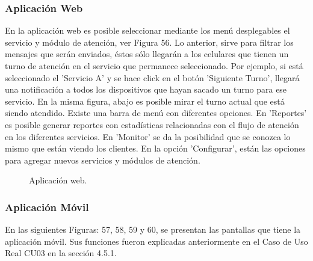 \subsubsection{Aplicación Web}

En la aplicación web es posible seleccionar mediante los menú desplegables el servicio y módulo de atención, ver Figura 56. Lo anterior, sirve para filtrar los mensajes que serán enviados, éstos sólo llegarán a los celulares que tienen un turno de atención en el servicio que permanece seleccionado. Por ejemplo, si está seleccionado el 'Servicio A' y se hace click en el botón 'Siguiente Turno', llegará una notificación a todos los dispositivos que hayan sacado un turno para ese servicio. En la misma figura, abajo es posible mirar el turno actual que está siendo atendido. Existe una barra de menú con diferentes opciones. En 'Reportes' es posible generar reportes con estadísticas relacionadas con el flujo de atención en los diferentes servicios. En 'Monitor' se da la posibilidad que se conozca lo mismo que están viendo los clientes. En la opción 'Configurar', están las opciones para agregar nuevos servicios y módulos de atención.

\begin{figure}[H]
\centering
\setlength\fboxsep{0pt}
\setlength\fboxrule{0.5pt}
\caption{Aplicación web.}
\label{registrarDispositivo}
\end{figure}

\subsubsection{Aplicación Móvil}

En las siguientes Figuras: 57, 58, 59 y 60, se presentan las pantallas que tiene la aplicación móvil. Sus funciones fueron explicadas anteriormente en el Caso de Uso Real CU03 en la sección 4.5.1.\\

